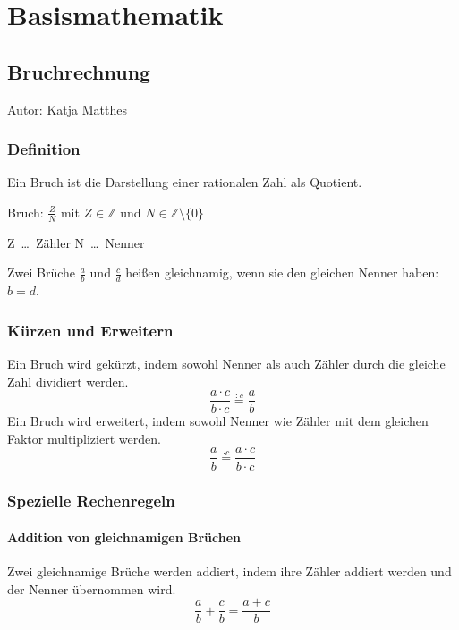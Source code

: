 \chapter{Basismathematik}

\section{Bruchrechnung}
\label{Bruchrechnung}
Autor: Katja Matthes
\subsection{Definition}
Ein Bruch ist die Darstellung einer rationalen Zahl als Quotient.

\qquad Bruch: $\frac{Z}{N}$ \qquad mit $Z \in \mathbb{Z}$ und $N \in \mathbb{Z}\setminus\{0\} $
	
\qquad Z\ \ldots\ Zähler \qquad N\ \ldots\ Nenner
	
Zwei Brüche $\frac{a}{b}$ und $\frac{c}{d}$ hei\ss en gleichnamig, wenn sie den gleichen Nenner haben: $b = d$.

\subsection{Kürzen und Erweitern}
Ein Bruch wird gekürzt, indem sowohl Nenner als auch Zähler durch die gleiche Zahl dividiert werden.
\[ \frac{a \cdot c}{b \cdot c} \stackrel{: c}{=} \frac{a}{b}\]
Ein Bruch wird erweitert, indem sowohl Nenner wie Zähler mit dem gleichen Faktor multipliziert werden.
\[ \frac{a}{b} \stackrel{\cdot c}{=}  \frac{a \cdot c}{b \cdot c} \]
	
\subsection{Spezielle Rechenregeln}
\subsubsection{Addition von gleichnamigen Brüchen}
Zwei gleichnamige Brüche werden addiert, indem ihre Zähler addiert werden und der Nenner übernommen wird.
	\[\frac{a}{b} + \frac{c}{b} = \frac{a+c}{b}\]
	
